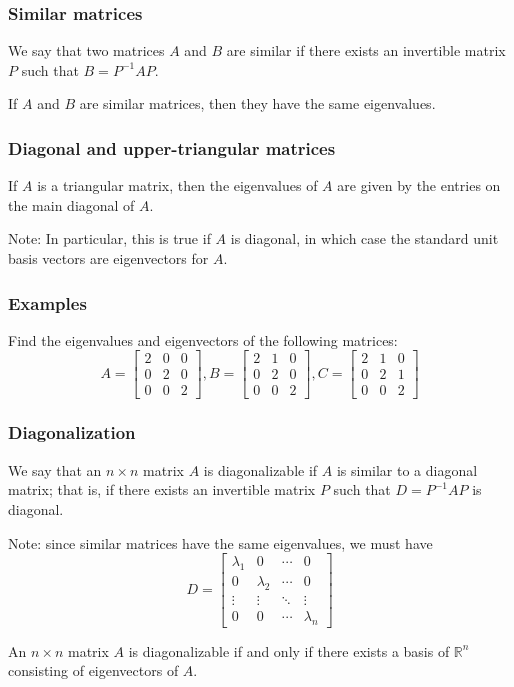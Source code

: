 \documentclass[11pt,t]{beamer}
\newcommand{\R}{\mathbb{R}}
\begin{document}
\begin{frame}
\frametitle{Similar matrices}
\begin{definition}
We say that two matrices $A$ and $B$ are \alert{similar} if there exists an invertible matrix $P$ such that $B=P^{-1}AP$.
\end{definition}
\begin{theorem}
If $A$ and $B$ are similar matrices, then they have the same eigenvalues.
\end{theorem}
\end{frame}
\begin{frame}
\frametitle{Diagonal and upper-triangular matrices}

\begin{theorem}
If $A$ is a triangular matrix, then the eigenvalues of $A$ are given by the entries on the main diagonal of $A$.
\end{theorem}
\alert{Note:} In particular, this is true if $A$ is diagonal, in which case the standard unit basis vectors are eigenvectors for $A$.
\end{frame}
\begin{frame}
\frametitle{Examples}

Find the eigenvalues and eigenvectors of the following matrices:
\[
A = \begin{bmatrix}2&0&0\\0&2&0\\0&0&2\end{bmatrix}, B = \begin{bmatrix}
2&1&0\\
0&2&0\\
0&0&2\end{bmatrix}, C = \begin{bmatrix}2&1&0\\0&2&1\\0&0&2\end{bmatrix}
\]

\end{frame}
\begin{frame}
\frametitle{Diagonalization}

\begin{definition}
We say that an $n\times n$ matrix $A$ is \alert{diagonalizable} if $A$ is similar to a diagonal matrix; that is, if there exists an invertible matrix $P$ such that $D=P^{-1}AP$ is diagonal.
\end{definition}
Note: since similar matrices have the same eigenvalues, we must have
\[
D = \begin{bmatrix}
\lambda_1 &0 &\cdots &0\\
0&\lambda_2&\cdots&0\\
\vdots&\vdots&\ddots&\vdots\\
0&0&\cdots&\lambda_n
\end{bmatrix}
\]
\begin{theorem}
An $n\times n$ matrix $A$ is diagonalizable if and only if there exists a basis of $\R^n$ consisting of eigenvectors of $A$.
\end{theorem}
\end{frame}
\end{document}

